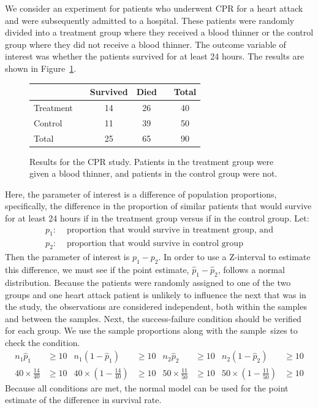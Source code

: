 We consider an experiment for patients who underwent CPR for a heart attack and were subsequently admitted to a hospital. These patients were randomly divided into a treatment group where they received a blood thinner or the control group where they did not receive a blood thinner. The outcome variable of interest was whether the patients survived for at least 24 hours.
    The results are shown in  Figure~\ref{resultsForCPRStudyInSmallSampleSection}.

\begin{figure}[ht]
\centering
\begin{tabular}{lccccc}
\hline
			&& Survived 	& Died 	&& Total \\
\hline
Treatment		&& 14		& 26		&& 40 \\
Control		&& 11		& 39		&& 50 \\

\hline
Total			&& 25		& 65		&& 90 \\
\hline
\end{tabular}
\caption{Results for the CPR study.
    Patients in the treatment group were given
    a blood thinner, and patients in the control
    group were not.}
\label{resultsForCPRStudyInSmallSampleSection}
\end{figure}


Here, the parameter of interest is a difference of population proportions, specifically, the difference in the proportion of similar patients that would survive for at least 24 hours if in the treatment group versus if in the control group.  Let:
\begin{align*}
p_1:& \text{ proportion that would survive in treatment group, and} \\
p_2:& \text{ proportion that would survive in control group}
\end{align*}
Then the parameter of interest is $p_1 - p_2$.  In order to use a Z-interval to estimate this difference, we must see if the point estimate, $\hat{p}_{1} - \hat{p}_{2}$, follows a normal distribution.  Because the patients were randomly assigned to one of the two groups and one heart attack patient is unlikely to influence the next that was in the study, the observations are considered independent, both within the samples and between the samples.  Next, the success-failure condition should be verified for each group.  We use the sample proportions along with the sample~sizes to check the condition.
\begin{align*}
n_1\hat{p}_1&\ge 10 & n_1(1-\hat{p}_1)&\ge 10 & n_2\hat{p}_2&\ge 10 & n_2(1-\hat{p}_2)&\ge 10 \\
40 \times \frac{14}{40} &\ge 10
	&40 \times (1-\frac{14}{40}) &\ge 10
	&50 \times \frac{11}{50} &\ge 10
	&50 \times (1-\frac{11}{50}) &\ge 10
\end{align*}
Because all conditions are met, the normal model can be used for the point estimate of the difference in survival rate.

